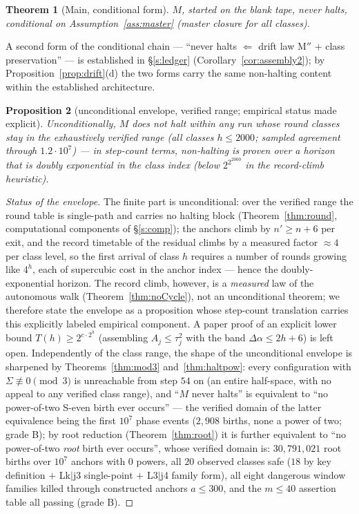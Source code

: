 \documentclass[11pt]{amsart}
\newtheorem{theorem}{Theorem}[section]
\newtheorem{proposition}[theorem]{Proposition}
\theoremstyle{definition}
\begin{document}
\begin{theorem}[Main, conditional form]\label{thm:main}
$M$, started on the blank tape, never halts, conditional on
Assumption~\ref{ass:master} (master closure for all classes).
\end{theorem}

A second form of the conditional chain --- ``never halts $\Leftarrow$ drift
law $\mathrm{M''}$ $+$ class preservation'' --- is established in
\S\ref{s:ledger} (Corollary~\ref{cor:assembly2}); by
Proposition~\ref{prop:drift}(d) the two forms carry the same non-halting
content within the established architecture.

\begin{proposition}[unconditional envelope, verified range; empirical status made explicit]\label{thm:envelope}
Unconditionally, $M$ does not halt within any run whose round classes stay
in the exhaustively verified range (all classes $h\le2000$; sampled
agreement through $1.2\cdot10^{7}$) --- in step-count terms, non-halting
is proven over a horizon that is doubly exponential in the class index
(below $2^{2^{2000}}$ in the record-climb heuristic).
\end{proposition}
\begin{proof}[Status of the envelope]
The finite part is unconditional: over the verified range the round table
is single-path and carries no halting block (Theorem~\ref{thm:round},
computational components of \S\ref{s:comp}); the anchors climb by
$n'\ge n+6$ per exit, and the record timetable of the residual climbs by
a measured factor $\approx4$ per class level, so the first arrival of
class $h$ requires a number of rounds growing like $4^{h}$, each of
supercubic cost in the anchor index --- hence the doubly-exponential
horizon. The record climb, however, is a \emph{measured} law of the
autonomous walk (Theorem~\ref{thm:noCycle}), not an unconditional
theorem; we therefore state the envelope as a proposition whose
step-count translation carries this explicitly labeled empirical
component. A paper proof of an explicit lower bound
$T(h)\ge2^{c\cdot2^{h}}$ (assembling $A_j\le\tau_j^2$ with the band
$\Delta\alpha\le2h+6$) is left open. Independently of the class range, the
shape of the unconditional envelope is sharpened by
Theorems~\ref{thm:mod3} and~\ref{thm:haltpow}: every configuration with
$\Sigma\not\equiv0\pmod3$ is unreachable from step $54$ on (an entire
half-space, with no appeal to any verified class range), and ``$M$ never
halts'' is equivalent to ``no power-of-two S-even birth ever occurs'' --- the
verified domain of the latter equivalence being the first $10^{7}$ phase
events ($2{,}908$ births, none a power of two; grade B); by root reduction
(Theorem~\ref{thm:root}) it is further equivalent to ``no power-of-two
\emph{root} birth ever occurs'', whose verified domain is: $30{,}791{,}021$
root births over $10^{7}$ anchors with $0$ powers, all $20$ observed classes
safe ($18$ by key definition $+$ Lk$|$j3 single-point $+$ L3$|$j4 family
form), all eight dangerous window families killed through constructed
anchors $a\le300$, and the $m\le40$ assertion table all passing (grade B).
\end{proof}
\end{document}
